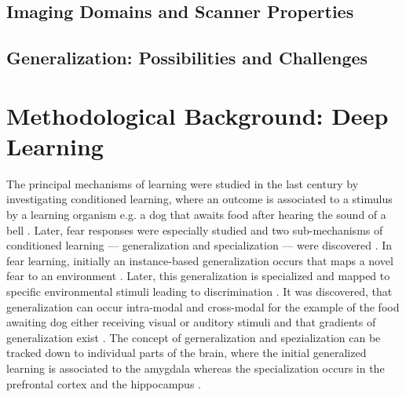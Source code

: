 
    \subsection{Imaging Domains and Scanner Properties} %
    \subsection{Generalization: Possibilities and Challenges} %

\section{Methodological Background: Deep Learning} %
    The principal mechanisms of learning were studied in the last century by investigating conditioned learning, where an outcome is associated to a stimulus by a learning organism e.g. a dog that awaits food after hearing the sound of a bell \citep{pavlov1928conditioned, pavlov2010conditioned, banich2011generalization}. Later, fear responses were especially studied and two sub-mechanisms of conditioned learning --- generalization and specialization --- were discovered \citep{banich2011generalization}.
    In fear learning, initially an instance-based generalization occurs that maps a novel fear to an environment \citep{banich2011generalization}. Later, this generalization is specialized and mapped to specific environmental stimuli leading to discrimination \citep{banich2011generalization}.
    It was discovered, that generalization can occur intra-modal and cross-modal for the example of the food awaiting dog either receiving visual or auditory stimuli \citep{pavlov1928conditioned} and that gradients of generalization exist \citep{guttman1956discriminability}.
    The concept of gerneralization and spezialization can be tracked down to individual parts of the brain, where the initial generalized learning is associated to the amygdala whereas the specialization occurs in the prefrontal cortex and the hippocampus \citep{banich2011generalization}.

